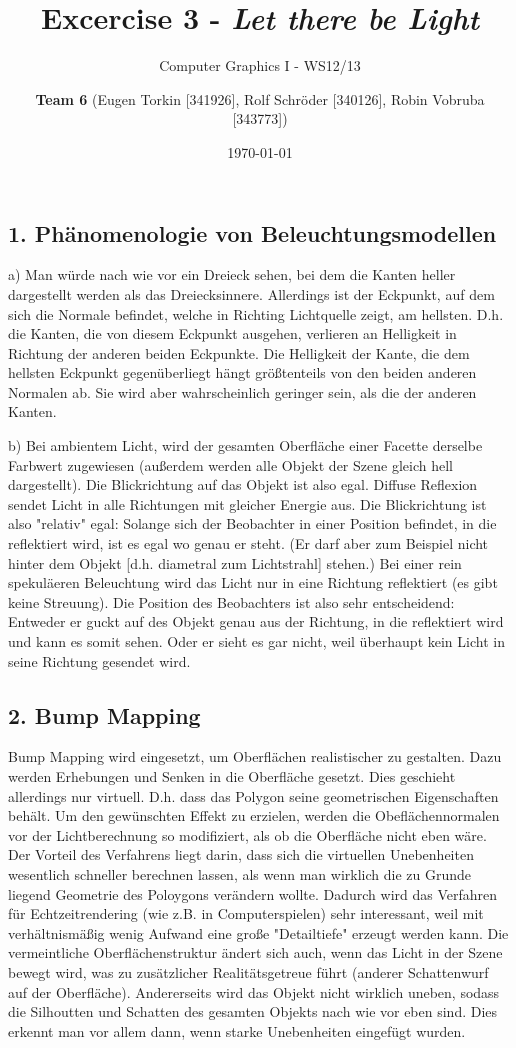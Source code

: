 \documentclass[a4paper,headings=small]{scrartcl}
\title{Excercise 3 - \emph{Let there be Light}}
\subtitle{Computer Graphics I - WS12/13}
\author{\textbf{Team 6} (Eugen Torkin [341926], Rolf Schröder [340126], Robin Vobruba [343773])}
\date{\today}
\numberwithin{equation}{section} %
\numberwithin{figure}{section}   %
\begin{document}
\maketitle


\subsection*{1. Phänomenologie von Beleuchtungsmodellen}
a) Man würde nach wie vor ein Dreieck sehen, bei dem die Kanten heller dargestellt werden als das Dreiecksinnere.
Allerdings ist der Eckpunkt, auf dem sich die Normale befindet, welche in Richting Lichtquelle zeigt, am hellsten.
D.h. die Kanten, die von diesem Eckpunkt ausgehen, verlieren an Helligkeit in Richtung der anderen beiden Eckpunkte.
Die Helligkeit der Kante, die dem hellsten Eckpunkt gegenüberliegt hängt größtenteils von den beiden anderen Normalen ab.
Sie wird aber wahrscheinlich geringer sein, als die der anderen Kanten.

b) Bei ambientem Licht, wird der gesamten Oberfläche einer Facette derselbe Farbwert zugewiesen (außerdem werden alle Objekt der Szene gleich hell dargestellt).
Die Blickrichtung auf das Objekt ist also egal.
Diffuse Reflexion sendet Licht in alle Richtungen mit gleicher Energie aus.
Die Blickrichtung ist also "relativ" egal:
Solange sich der Beobachter in einer Position befindet, in die reflektiert wird, ist es egal wo genau er steht.
(Er darf aber zum Beispiel nicht hinter dem Objekt [d.h. diametral zum Lichtstrahl] stehen.)
Bei einer rein spekuläeren Beleuchtung wird das Licht nur in eine Richtung reflektiert (es gibt keine Streuung).
Die Position des Beobachters ist also sehr entscheidend:
Entweder er guckt auf des Objekt genau aus der Richtung, in die reflektiert wird und kann es somit sehen.
Oder er sieht es gar nicht, weil überhaupt kein Licht in seine Richtung gesendet wird.

\subsection*{2. Bump Mapping}
Bump Mapping wird eingesetzt, um Oberflächen realistischer zu gestalten.
Dazu werden Erhebungen und Senken in die Oberfläche gesetzt.
Dies geschieht allerdings nur virtuell.
D.h. dass das Polygon seine geometrischen Eigenschaften behält.
Um den gewünschten Effekt zu erzielen, werden die Obeflächennormalen vor der Lichtberechnung so modifiziert, als ob die Oberfläche nicht eben wäre.
Der Vorteil des Verfahrens liegt darin, dass sich die virtuellen Unebenheiten wesentlich schneller berechnen lassen, als wenn man wirklich die zu Grunde liegend Geometrie des Poloygons verändern wollte. Dadurch wird das Verfahren für Echtzeitrendering (wie z.B. in Computerspielen) sehr interessant, weil mit verhältnismäßig wenig Aufwand eine große "Detailtiefe" erzeugt werden kann. Die vermeintliche Oberflächenstruktur ändert sich auch, wenn das Licht in der Szene bewegt wird, was zu zusätzlicher Realitätsgetreue führt (anderer Schattenwurf auf der Oberfläche).
Andererseits wird das Objekt nicht wirklich uneben, sodass die Silhoutten und Schatten des gesamten Objekts nach wie vor eben sind. Dies erkennt man vor allem dann, wenn starke Unebenheiten eingefügt wurden.
\end{document}
